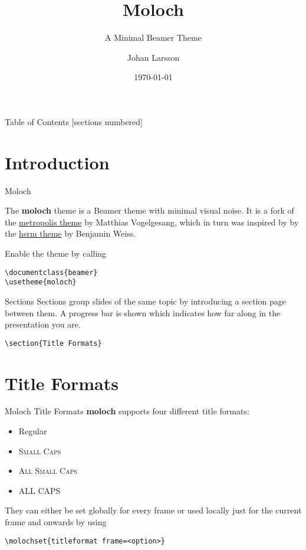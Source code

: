 \documentclass[10pt]{beamer}
\title{Moloch}
\subtitle{A Minimal Beamer Theme}
\date{\today}
\author{Johan Larsson}
\institute{The Department of Statistics, Lund University}
\newcommand{\themename}{\textbf{moloch}\xspace}
\begin{document}
\maketitle

\begin{frame}{Table of Contents}
  [sections numbered]
  \tableofcontents[hideallsubsections]
\end{frame}

\section{Introduction}

\begin{frame}[fragile]{Moloch}

  The \themename theme is a Beamer theme with minimal visual noise. It is a fork of the
  \href{https://github.com/matze/mtheme}{metropolis theme} by Matthias Vogelgesang, which in turn was inspired by
  by the \href{https://github.com/hsrmbeamertheme/hsrmbeamertheme}{hsrm theme} by Benjamin Weiss.

  Enable the theme by calling
  \begin{verbatim}\documentclass{beamer}
\usetheme{moloch}\end{verbatim}
\end{frame}
\begin{frame}[fragile]{Sections}
  Sections group slides of the same topic by introducing a section page between them. A progress bar is shown which indicates how far along in the presentation you are.

  \begin{verbatim}\section{Title Formats}\end{verbatim}
\end{frame}

\section{Title Formats}

\begin{frame}[fragile]{Moloch Title Formats}
  \themename supports four different title formats:
  \begin{itemize}
    \item Regular
    \item \textsc{Small Caps}
    \item \textsc{All Small Caps}
    \item ALL CAPS
  \end{itemize}

  They can either be set globally for every frame or used locally just for the current frame and onwards by using
  \begin{verbatim}\molochset{titleformat frame=<option>}\end{verbatim}
\end{frame}
\end{document}
